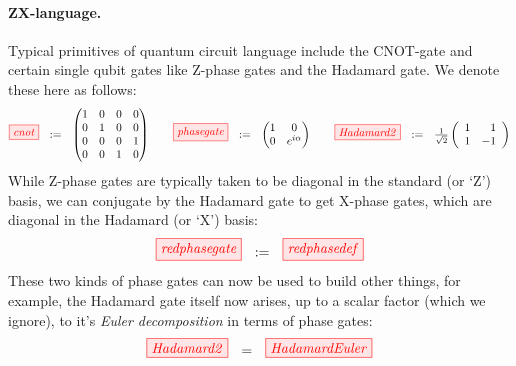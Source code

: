 \documentclass[11pt]{article}
\theoremstyle{definition}
\def\bR{\begin{color}{red}}
\def\e{\end{color}\xspace}
\begin{document}
\paragraph{ZX-language.} Typical primitives of  quantum circuit language  include the CNOT-gate and certain single qubit gates like Z-phase gates and the Hadamard gate.  We denote these here as follows: 
\[
\tikzfig{cnot}\ \ :=\ \ \left( \begin{matrix}
  1 & 0 & 0 & 0 \\
  0 & 1 & 0 & 0 \\ 
  0 & 0 & 0 & 1 \\
  0 & 0 & 1 & 0
\end{matrix} \right) 
\qquad
\tikzfig{phasegate}\ \ :=\ \  
\left(\begin{matrix}
1 & 0 \\
0 & e^{i \alpha}
\end{matrix}\right) 
\qquad
\tikzfig{Hadamard2}\ \ :=\ \ 
\textstyle{\frac{1}{\sqrt{2}}}  
\left(
\begin{array}{cr}
  1 & 1 \\
  1 & -1
\end{array}
\right)
\]
While Z-phase gates are typically taken to be diagonal in the standard (or `Z') basis, we can conjugate by the Hadamard gate to get X-phase gates, which are diagonal in the Hadamard (or `X') basis: 
\[
\tikzfig{redphasegate}\ \ :=\ \ \tikzfig{redphasedef} 
\]
These two kinds of phase gates  can now be used to build  other things, for example, the Hadamard gate itself now arises, up to a scalar factor (which we ignore), to it's \textit{Euler decomposition} in terms of phase gates:
\[
\tikzfig{Hadamard2}\ \ =\ \ \tikzfig{HadamardEuler}
\]
\end{document}
